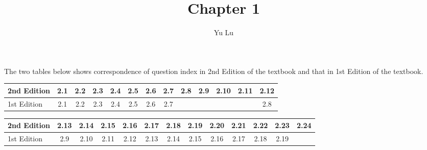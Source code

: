 \documentclass{article}
\title{Chapter 1}
\author{Yu Lu}
\begin{document}
    \maketitle
    The two tables below shows correspondence of question index in 2nd Edition of the textbook and that in 1st Edition of the textbook. 
\begin{table}[h!]
    \begin{center}
      \begin{tabular}{l|c|c|c|c|c|c|c|c|c|c|c|c} 
        \hline
        2nd Edition
        &2.1
        &2.2
        &2.3
        &2.4
        &2.5
        &2.6
        &2.7
        &2.8
        &2.9
        &2.10
        &2.11
        &2.12
        \\ \hline
        1st Edition
        &2.1
        &2.2
        &2.3
        &2.4
        &2.5
        &2.6
        &2.7
        &
        &
        &
        &
        &2.8
        \\ \hline
      \end{tabular}
    \end{center}
\end{table}
\begin{table}[h!]
    \begin{center}
      \begin{tabular}{l|c|c|c|c|c|c|c|c|c|c|c|c} 
        \hline
        2nd Edition
        &2.13
        &2.14
        &2.15
        &2.16
        &2.17
        &2.18
        &2.19
        &2.20
        &2.21
        &2.22
        &2.23
        &2.24
        \\ \hline
        1st Edition
        &2.9
        &2.10
        &2.11
        &2.12
        &2.13
        &2.14
        &2.15
        &2.16
        &2.17
        &2.18
        &2.19
        &
        \\ \hline
      \end{tabular}
    \end{center}
  \end{table}
\end{document}
